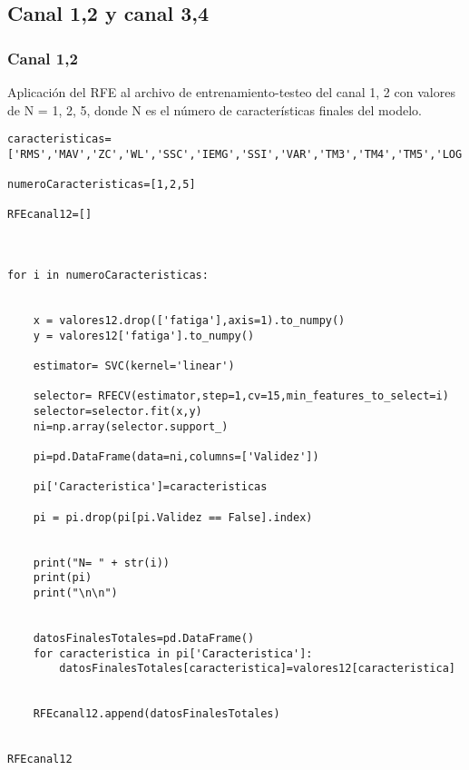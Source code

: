    \subsection{Canal 1,2 y canal 3,4}
        \subsubsection{Canal 1,2}
Aplicación del RFE al archivo de entrenamiento-testeo del canal 1, 2 con valores de N = 1, 2, 5, donde N es el número de características finales del modelo.
\begin{lstlisting}
caracteristicas=['RMS','MAV','ZC','WL','SSC','IEMG','SSI','VAR','TM3','TM4','TM5','LOG','ACC','MNF','MDF']

numeroCaracteristicas=[1,2,5]

RFEcanal12=[]



for i in numeroCaracteristicas:
    
    
    x = valores12.drop(['fatiga'],axis=1).to_numpy()
    y = valores12['fatiga'].to_numpy()

    estimator= SVC(kernel='linear')

    selector= RFECV(estimator,step=1,cv=15,min_features_to_select=i)
    selector=selector.fit(x,y)
    ni=np.array(selector.support_)

    pi=pd.DataFrame(data=ni,columns=['Validez'])

    pi['Caracteristica']=caracteristicas

    pi = pi.drop(pi[pi.Validez == False].index)

    
    print("N= " + str(i))
    print(pi)
    print("\n\n")


    datosFinalesTotales=pd.DataFrame()
    for caracteristica in pi['Caracteristica']:
        datosFinalesTotales[caracteristica]=valores12[caracteristica]


    RFEcanal12.append(datosFinalesTotales)


RFEcanal12
\end{lstlisting}

